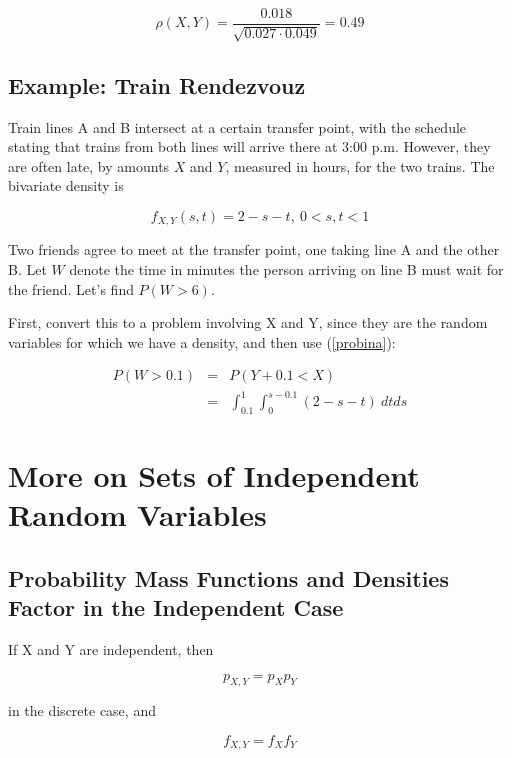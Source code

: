 \begin{equation}
\rho(X,Y) = \frac{0.018}{\sqrt{0.027 \cdot 0.049}} = 0.49
\end{equation}

\subsection{Example:  Train Rendezvouz}

Train lines A and B intersect at a certain transfer point, with the
schedule stating that trains from both lines will arrive there at 3:00
p.m.  However, they are often late, by amounts $X$ and $Y$, measured in
hours, for the two trains.  The bivariate density is

\begin{equation}
f_{X,Y}(s,t) = 2 - s -t, ~ 0 < s,t < 1
\end{equation}

Two friends agree to meet at the transfer point, one taking line A and
the other B.  Let $W$ denote the time in minutes the person arriving on
line B must wait for the friend.  Let's find $P(W > 6)$.

First, convert this to a problem involving X and Y, since they are the
random variables for which we have a density, and then use (\ref{probina}):

\begin{eqnarray}
P(W > 0.1) &=& P(Y + 0.1 < X ) \\
&=& \int_{0.1}^{1}   
\int_{0}^{s-0.1} (2-s-t) ~ dt ds
\end{eqnarray}

\section{More on Sets of Independent Random Variables}

\subsection{Probability Mass Functions and Densities Factor in the
Independent Case}
\label{theyfactor}

If X and Y are independent, then 

\begin{equation}
\label{indeppmf}
p_{X,Y} = p_X p_Y
\end{equation}

in the discrete case, and 

\begin{equation}
\label{indepdens}
f_{X,Y} = f_X f_Y
\end{equation}

